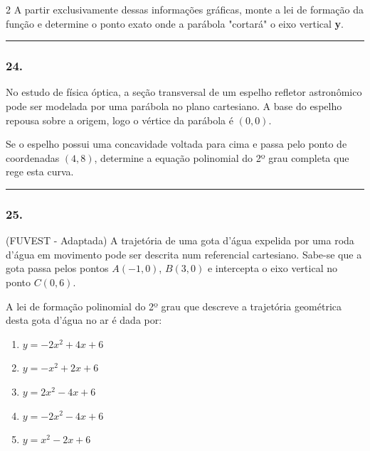 \documentclass[twoside, 10pt, a4paper]{article}
\newlength{\espacoPreQuestao}
\newlength{\espacoQuestao}
\begin{document}
\begin{multicols*}{2}
A partir exclusivamente dessas informações gráficas, monte a lei de formação da função e determine o ponto exato onde a parábola "cortará" o eixo vertical \textbf{y}.
\par\vspace{\espacoQuestao}

\noindent\textcolor{CorLinha}{\rule{\linewidth}{0.5pt}} 
\par\vspace{\espacoPreQuestao}
\subsubsection*{24.} No estudo de física óptica, a seção transversal de um espelho refletor astronômico pode ser modelada por uma parábola no plano cartesiano. A base do espelho repousa sobre a origem, logo o vértice da parábola é $(0,0)$.

Se o espelho possui uma concavidade voltada para cima e passa pelo ponto de coordenadas $(4, 8)$, determine a equação polinomial do 2º grau completa que rege esta curva. 
\par\vspace{\espacoQuestao}

\noindent\textcolor{CorLinha}{\rule{\linewidth}{0.5pt}} 
\par\vspace{\espacoPreQuestao}
\subsubsection*{25.} (FUVEST - Adaptada) A trajetória de uma gota d'água expelida por uma roda d'água em movimento pode ser descrita num referencial cartesiano. Sabe-se que a gota passa pelos pontos $A(-1, 0)$, $B(3, 0)$ e intercepta o eixo vertical no ponto $C(0, 6)$.

A lei de formação polinomial do 2º grau que descreve a trajetória geométrica desta gota d'água no ar é dada por:

\begin{enumerate}[label=\alph*)]
    \item $y = -2x^2 + 4x + 6$
    \item $y = -x^2 + 2x + 6$
    \item $y = 2x^2 - 4x + 6$
    \item $y = -2x^2 - 4x + 6$
    \item $y = x^2 - 2x + 6$
\end{enumerate}
\par\vspace{\espacoQuestao}


\end{multicols*}
\end{document}
